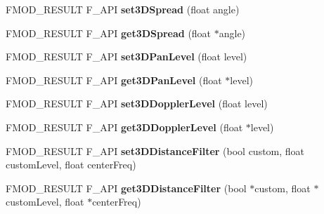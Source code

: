 \begin{DoxyCompactItemize}
\item 
\hypertarget{class_f_m_o_d_1_1_channel_a59fb99f17a8997b14d983647e6978c07}{F\-M\-O\-D\-\_\-\-R\-E\-S\-U\-L\-T F\-\_\-\-A\-P\-I {\bfseries set3\-D\-Spread} (float angle)}\label{class_f_m_o_d_1_1_channel_a59fb99f17a8997b14d983647e6978c07}

\item 
\hypertarget{class_f_m_o_d_1_1_channel_a527cbba8333bfe7515fe18208765ac61}{F\-M\-O\-D\-\_\-\-R\-E\-S\-U\-L\-T F\-\_\-\-A\-P\-I {\bfseries get3\-D\-Spread} (float $\ast$angle)}\label{class_f_m_o_d_1_1_channel_a527cbba8333bfe7515fe18208765ac61}

\item 
\hypertarget{class_f_m_o_d_1_1_channel_aaeadeb90b4c702d16b6083a17905efc5}{F\-M\-O\-D\-\_\-\-R\-E\-S\-U\-L\-T F\-\_\-\-A\-P\-I {\bfseries set3\-D\-Pan\-Level} (float level)}\label{class_f_m_o_d_1_1_channel_aaeadeb90b4c702d16b6083a17905efc5}

\item 
\hypertarget{class_f_m_o_d_1_1_channel_ac8779446fdac236616964ac5bddec5be}{F\-M\-O\-D\-\_\-\-R\-E\-S\-U\-L\-T F\-\_\-\-A\-P\-I {\bfseries get3\-D\-Pan\-Level} (float $\ast$level)}\label{class_f_m_o_d_1_1_channel_ac8779446fdac236616964ac5bddec5be}

\item 
\hypertarget{class_f_m_o_d_1_1_channel_a7e1c29fc420d38a9a686a0a29996209a}{F\-M\-O\-D\-\_\-\-R\-E\-S\-U\-L\-T F\-\_\-\-A\-P\-I {\bfseries set3\-D\-Doppler\-Level} (float level)}\label{class_f_m_o_d_1_1_channel_a7e1c29fc420d38a9a686a0a29996209a}

\item 
\hypertarget{class_f_m_o_d_1_1_channel_a90e0a82f15339ae3a9442ad04bec229b}{F\-M\-O\-D\-\_\-\-R\-E\-S\-U\-L\-T F\-\_\-\-A\-P\-I {\bfseries get3\-D\-Doppler\-Level} (float $\ast$level)}\label{class_f_m_o_d_1_1_channel_a90e0a82f15339ae3a9442ad04bec229b}

\item 
\hypertarget{class_f_m_o_d_1_1_channel_a6c180f229b8edffa88ecc2ef99a581e3}{F\-M\-O\-D\-\_\-\-R\-E\-S\-U\-L\-T F\-\_\-\-A\-P\-I {\bfseries set3\-D\-Distance\-Filter} (bool custom, float custom\-Level, float center\-Freq)}\label{class_f_m_o_d_1_1_channel_a6c180f229b8edffa88ecc2ef99a581e3}

\item 
\hypertarget{class_f_m_o_d_1_1_channel_abf9d4d1cc96e3e79ea316172524a3c6a}{F\-M\-O\-D\-\_\-\-R\-E\-S\-U\-L\-T F\-\_\-\-A\-P\-I {\bfseries get3\-D\-Distance\-Filter} (bool $\ast$custom, float $\ast$custom\-Level, float $\ast$center\-Freq)}\label{class_f_m_o_d_1_1_channel_abf9d4d1cc96e3e79ea316172524a3c6a}


\end{DoxyCompactItemize}

